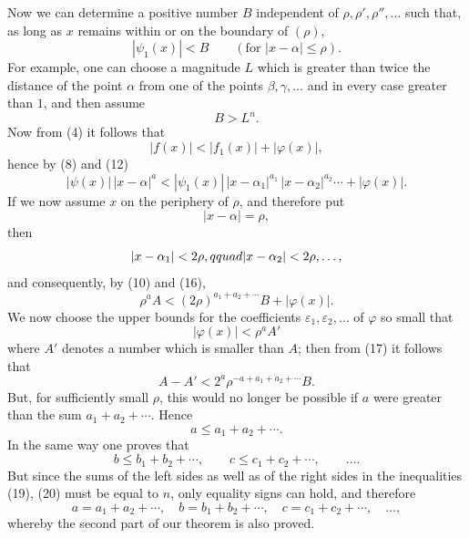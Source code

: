 \documentclass[11pt]{article}
\begin{document}
Now we can determine a positive number $B$ independent of $\rho,\rho',\rho'',\ldots$ such that, as long as $x$ remains within or on the boundary of $(\rho)$,
\begin{equation}
 |\psi_1(x)|<B \qquad (\text{for } |x-\alpha|\le \rho).
\tag{14}
\end{equation}
For example, one can choose a magnitude $L$ which is greater than twice the distance of the point $\alpha$ from one of the points $\beta,\gamma,\ldots$ and in every case greater than $1$, and then assume
\[
 B>L^n .
\]
Now from (4) it follows that
\begin{equation}
 |f(x)|<|f_1(x)|+|\varphi(x)|,
\tag{15}
\end{equation}
hence by (8) and (12)
\begin{equation}
 |\psi(x)|\,|x-\alpha|^a<|\psi_1(x)|\,|x-\alpha_1|^{a_1}\,|x-\alpha_2|^{a_2}\cdots+|\varphi(x)|.
\tag{16}
\end{equation}
If we now assume $x$ on the periphery of $\rho$, and therefore put
\[
 |x-\alpha|=\rho,
\]
then
\[
 |x-\alpha_1|<2\rho,\\qquad |x-\alpha_2|<2\rho,\ldots,
\]
and consequently, by (10) and (16),
\begin{equation}
 \rho^a A < (2\rho)^{a_1+a_2+\cdots}B+|\varphi(x)|.
\tag{17}
\end{equation}
We now choose the upper bounds for the coefficients $\varepsilon_1,\varepsilon_2,
\ldots$ of $\varphi$ so small that
\[
 |\varphi(x)|<\rho^aA'
\]
where $A'$ denotes a number which is smaller than $A$; then from (17) it follows that
\begin{equation}
 A-A'<2^{a}\rho^{-a+a_1+a_2+\cdots}B.
\tag{18}
\end{equation}
But, for sufficiently small $\rho$, this would no longer be possible if $a$ were greater than the sum $a_1+a_2+\cdots$. Hence
\begin{equation}
 a\le a_1+a_2+\cdots .
\tag{19}
\end{equation}
In the same way one proves that
\begin{equation}
 b\le b_1+b_2+\cdots,
 \qquad
 c\le c_1+c_2+\cdots,
 \qquad \ldots .
\tag{20}
\end{equation}
But since the sums of the left sides as well as of the right sides in the inequalities (19), (20) must be equal to $n$, only equality signs can hold, and therefore
\[
 a=a_1+a_2+\cdots,
 \quad b=b_1+b_2+\cdots,
 \quad c=c_1+c_2+\cdots,
 \quad \ldots,
\]
whereby the second part of our theorem is also proved.
\end{document}
